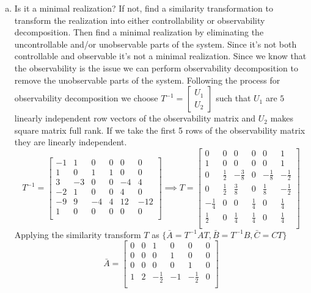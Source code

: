 \documentclass{article}
\begin{document}
\begin{enumerate}[(a)]
\item Is it a minimal realization?
If not, find a similarity transformation to transform the realization into either controllability or observability decomposition.
Then find a minimal realization by eliminating the uncontrollable and/or unobservable parts of the system.
\newline
Since it's not both controllable and observable it's not a minimal realization.
Since we know that the observability is the issue we can perform observability decomposition to remove the unobservable parts of the system.
Following the process for observability decomposition we choose $T^{-1} = \begin{bmatrix}U_1 \\ U_2 \end{bmatrix}$ such that $U_1$ are $5$ linearly independent row vectors of the observability matrix and $U_2$ makes square matrix full rank.
If we take the first 5 rows of the observability matrix they are linearly independent.
$$
T^{-1} =
\begin{bmatrix}
-1 & 1 & 0 & 0 & 0 & 0 \\
1 & 0 & 1 & 1 & 0 & 0 \\
3 & -3 & 0 & 0 & -4 & 4 \\
-2 & 1 & 0 & 0 & 4 & 0 \\
-9 & 9 & -4 & 4 & 12 & -12 \\
1 & 0 & 0 & 0 & 0 & 0 \\
\end{bmatrix}
\implies
T =
\begin{bmatrix}
0 & 0 & 0 & 0 & 0 & 1 \\
1 & 0 & 0 & 0 & 0 & 1 \\
0 & \frac{1}{2} & -\frac{3}{8} & 0 & -\frac{1}{8} & -\frac{1}{2} \\
0 & \frac{1}{2} & \frac{3}{8} & 0 & \frac{1}{8} & -\frac{1}{2} \\
-\frac{1}{4} & 0 & 0 & \frac{1}{4} & 0 & \frac{1}{4} \\
\frac{1}{2} & 0 & \frac{1}{4} & \frac{1}{4} & 0 & \frac{1}{4} \\
\end{bmatrix}
$$
Applying the similarity transform $T$ as $\{\bar{A} = T^{-1}AT, \bar{B}=T^{-1}B, \bar{C}=CT\}$
$$
\bar{A} =
\begin{bmatrix}
0 & 0 & 1 & 0 & 0 & 0 \\
0 & 0 & 0 & 1 & 0 & 0 \\
0 & 0 & 0 & 0 & 1 & 0 \\
1 & 2 & -\frac{1}{2} & -1 & -\frac{1}{2} & 0 \\

\end{bmatrix}$$
\end{enumerate}
\end{document}
